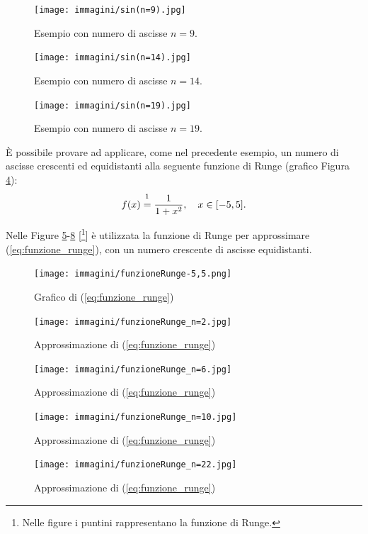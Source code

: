 \begin{figure}%
\centering
\texttt{[image: immagini/sin(n=9).jpg]}
\caption{Esempio con numero di ascisse $n=9$.}\label{fig:approxErrIntepolaz9}
\end{figure}

\begin{figure}%
\centering
\texttt{[image: immagini/sin(n=14).jpg]}
\caption{Esempio con numero di ascisse $n=14$.}\label{fig:approxErrIntepolaz14}
\end{figure}

\begin{figure}%
\centering
\texttt{[image: immagini/sin(n=19).jpg]}
\caption{Esempio con numero di ascisse $n=19$.}\label{fig:approssimazione_errore_intepolazione19}
\end{figure}

\begin{example}
	È possibile provare ad applicare, come nel precedente esempio, un numero di ascisse crescenti ed equidistanti alla seguente funzione di Runge (grafico Figura \ref{fig:funzione_runge-5,5}):
	\begin{equation}\label{eq:funzione_runge}
		f(x)\overset{\footnotemark}{=}\frac{1}{1+x^2},\quad x\in [-5,5].
	\end{equation}
	
	
	Nelle Figure \ref{fig:funzione_runge_n=2}-\ref{fig:funzione_runge_n=22} [\footnote{Nelle figure i puntini rappresentano la funzione di Runge.}] è utilizzata la funzione di Runge per approssimare (\ref{eq:funzione_runge}), con un numero crescente di ascisse equidistanti.
\end{example}

\begin{figure}
	\centering
	\texttt{[image: immagini/funzioneRunge-5,5.png]}
	\caption{Grafico di (\ref{eq:funzione_runge})}\label{fig:funzione_runge-5,5}
\end{figure}

\begin{figure}
    \centering
    \texttt{[image: immagini/funzioneRunge\_n=2.jpg]}
    \caption{Approssimazione di (\ref{eq:funzione_runge})}\label{fig:funzione_runge_n=2}
\end{figure}
\begin{figure}
    \centering
    \texttt{[image: immagini/funzioneRunge\_n=6.jpg]}
    \caption{Approssimazione di (\ref{eq:funzione_runge})}\label{fig:funzione_runge_n=6}
\end{figure}
\begin{figure}
    \centering
    \texttt{[image: immagini/funzioneRunge\_n=10.jpg]}
    \caption{Approssimazione di (\ref{eq:funzione_runge})}\label{fig:funzione_runge_n=10}
\end{figure}
\begin{figure}
    \centering
    \texttt{[image: immagini/funzioneRunge\_n=22.jpg]}
    \caption{Approssimazione di (\ref{eq:funzione_runge})}\label{fig:funzione_runge_n=22}
\end{figure}

